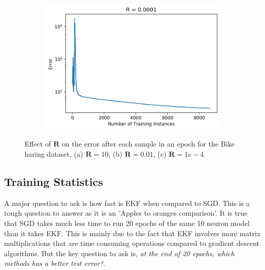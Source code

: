 \documentclass{article}
\begin{document}
\begin{figure}[ht]
    \begin{subfigure}[b]{0.5\linewidth}
        \includegraphics[width=\textwidth]{R1e-4.png}
        \caption{}
        \label{fig:R1e-4}
    \end{subfigure}%
    \caption{Effect of $\boldsymbol{R}$ on the error after each sample in an epoch for the Bike haring dataset, (a) $\boldsymbol{R}=10$, (b) $\boldsymbol{R}=0.01$, (c) $\boldsymbol{R}=1e-4$}
    \label{fig:R}
\end{figure}

\subsection{Training Statistics}
A major question to ask is how fast is EKF when compared to SGD. This is a tough question to answer as it is an 'Apples to oranges comparison'. It is true that SGD takes much less time to run 20 epochs of the same 10 neuron model than it takes EKF. This is mainly due to the fact that EKF involves more matrix multiplications that are time consuming operations compared to gradient descent algorithms. But the key question to ask is, \textit{at the end of 20 epochs, which methods has a better test error?}. 
\end{document}
